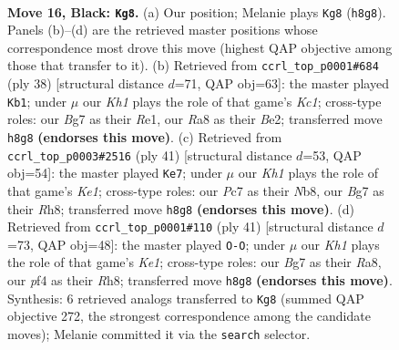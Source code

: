 \documentclass[11pt]{article}
\begin{document}
\clearpage

\begin{figure}[p]\centering
\begin{subfigure}{0.46\textwidth}\centering
\resizebox{\linewidth}{!}{%
\newchessgame
\chessboard[
  setfen={r1br3k/1pp3bp/5np1/PP3p2/4pP1P/6P1/4P1B1/RNB2RK1 b - - 0 16},
  showmover=false,
  pgfstyle=straightmove, color=movearrow, markmove={h8-g8}
]}
\caption{}
\end{subfigure}\hfill
\begin{subfigure}{0.46\textwidth}\centering
\resizebox{\linewidth}{!}{%
\newchessgame
\chessboard[
  setfen={2r1r1k1/3nbppp/p1bpp3/1p4P1/1P1RPP1P/2N1B3/1PP1B3/2K1R3 w - - 1 20},
  showmover=false,
  pgfstyle=straightmove, color=movearrow, markmove={c1-b1}
]}
\caption{}
\end{subfigure}
\\[4pt]
\begin{subfigure}{0.46\textwidth}\centering
\resizebox{\linewidth}{!}{%
\newchessgame
\chessboard[
  setfen={1n2k2r/2rb1ppp/p3p3/1p1pP3/3N1PP1/P1P2B2/1P5P/R4RK1 b k - 0 21},
  showmover=false,
  pgfstyle=straightmove, color=movearrow, markmove={e8-e7}
]}
\caption{}
\end{subfigure}\hfill
\begin{subfigure}{0.46\textwidth}\centering
\resizebox{\linewidth}{!}{%
\newchessgame
\chessboard[
  setfen={r3k2r/1b2bpp1/p3p3/1p5n/3B3p/2P4P/PPB2PP1/R3RNK1 b kq - 2 21},
  showmover=false,
  pgfstyle=straightmove, color=movearrow, markmove={e8-g8}
]}
\caption{}
\end{subfigure}
\caption{\textbf{Move 16, Black: \texttt{Kg8}.} (a) Our position; Melanie plays \texttt{Kg8} (\texttt{h8g8}). Panels (b)--(d) are the retrieved master positions whose correspondence most drove this move (highest QAP objective among those that transfer to it). (b) Retrieved from \texttt{ccrl\_top\_p0001\#684} (ply 38) [structural distance $d$=71, QAP obj=63]: the master played \texttt{Kb1}; under $\mu$ our \emph{Kh1} plays the role of that game's \emph{Kc1}; cross-type roles: our \emph{B}g7 as their \emph{R}e1, our \emph{R}a8 as their \emph{B}e2; transferred move \texttt{h8g8} \textbf{(endorses this move)}. (c) Retrieved from \texttt{ccrl\_top\_p0003\#2516} (ply 41) [structural distance $d$=53, QAP obj=54]: the master played \texttt{Ke7}; under $\mu$ our \emph{Kh1} plays the role of that game's \emph{Ke1}; cross-type roles: our \emph{P}c7 as their \emph{N}b8, our \emph{B}g7 as their \emph{R}h8; transferred move \texttt{h8g8} \textbf{(endorses this move)}. (d) Retrieved from \texttt{ccrl\_top\_p0001\#110} (ply 41) [structural distance $d$=73, QAP obj=48]: the master played \texttt{O-O}; under $\mu$ our \emph{Kh1} plays the role of that game's \emph{Ke1}; cross-type roles: our \emph{B}g7 as their \emph{R}a8, our \emph{p}f4 as their \emph{R}h8; transferred move \texttt{h8g8} \textbf{(endorses this move)}. Synthesis: 6 retrieved analogs transferred to \texttt{Kg8} (summed QAP objective 272, the strongest correspondence among the candidate moves); Melanie committed it via the \texttt{search} selector.}
\label{fig:thought-m31}
\end{figure}
\end{document}
